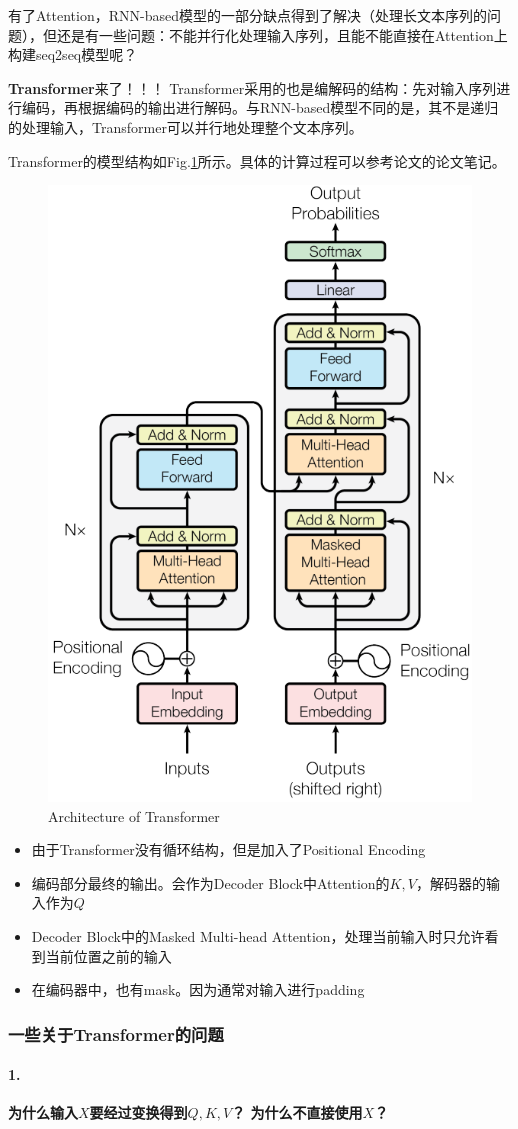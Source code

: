有了Attention，RNN-based模型的一部分缺点得到了解决（处理长文本序列的问题），但还是有一些问题：不能并行化处理输入序列，且能不能直接在Attention上构建seq2seq模型呢？

\textbf{Transformer}\cite{vaswani2017attention}来了！！！
Transformer采用的也是编解码的结构：先对输入序列进行编码，再根据编码的输出进行解码。与RNN-based模型不同的是，其不是递归的处理输入，Transformer可以并行地处理整个文本序列。 

Transformer的模型结构如Fig.\ref{fig:transformer}所示。具体的计算过程可以参考论文\cite{bivaswani2017attentionbid}的论文笔记。
\begin{figure}[h] 
	\centering
	\includegraphics[width=.4\textwidth]{pics/Transformer.png}
	\caption{Architecture of Transformer}
	\label{fig:transformer}
\end{figure}

\begin{itemize}
	\item 由于Transformer没有循环结构，但是加入了Positional Encoding
	\item 编码部分最终的输出。会作为Decoder Block中Attention的$K, V$，解码器的输入作为$Q$
	\item Decoder Block中的Masked Multi-head Attention，处理当前输入时只允许看到当前位置之前的输入
	\item 在编码器中，也有mask。因为通常对输入进行padding
\end{itemize}

\subsubsection{一些关于Transformer的问题}
\paragraph{1.}{\textbf{为什么输入$X$要经过变换得到$Q, K, V$？ 为什么不直接使用$X$？}}

